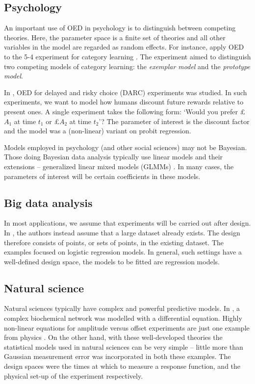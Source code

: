 \subsection{Psychology}
An important use of OED in psychology is to distinguish between competing theories. Here, the parameter space is a finite set of theories and all other variables in the model are regarded as random effects. For instance, \cite{ouyang2016} apply OED to the 5-4 experiment for category learning \cite{medin1978}. The experiment aimed to distinguish two competing models of category learning: the \textit{exemplar model} and the \textit{prototype model}.

In \cite{vincent2017}, OED for delayed and risky choice (DARC) experiments was studied. In such experiments, we want to model how humans discount future rewards relative to present ones. A single experiment takes the following form: `Would you prefer £$A_1$ at time $t_1$ or £$A_2$ at time $t_2$'? The parameter of interest is the discount factor and the model was a (non-linear) variant on probit regression.

Models employed in psychology (and other social sciences) may not be Bayesian. Those doing Bayesian data analysis typically use linear models and their extensions -- generalized linear mixed models (GLMMs) \cite{kruschkebda, gelmanbda}. In many cases, the parameters of interest will be certain coefficients in these models.

\subsection{Big data analysis}
In most applications, we assume that experiments will be carried out after design. In \cite{drovandi2017}, the authors instead assume that a large dataset already exists. The design therefore consists of points, or sets of points, in the existing dataset. The examples focused on logistic regression models. In general, such settings have a well-defined design space, the models to be fitted are regression models.

\subsection{Natural science}
Natural sciences typically have complex and powerful predictive models. In \cite{vanlier2012}, a complex biochemical network was modelled with a differential equation. Highly non-linear equations for amplitude versus offset experiments are just one example from physics \cite{berg2003}. On the other hand, with these well-developed theories the statistical models used in natural sciences can be very simple -- little more than Gaussian measurement error was incorporated in both these examples. The design spaces were the times at which to measure a response function, and the physical set-up of the experiment respectively.


